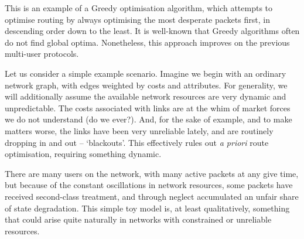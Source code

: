 \documentclass[aps,rmp,twocolumn,amsmath,amssymb,nofootinbib,superscriptaddress,longbibliography,floatfix]{revtex4-1}
\begin{document}
This is an example of a {\sc Greedy} optimisation algorithm, which attempts to optimise routing by always optimising the most desperate packets first, in descending order down to the least. It is well-known that {\sc Greedy} algorithms often do not find global optima. Nonetheless, this approach improves on the previous multi-user protocols.

Let us consider a simple example scenario. Imagine we begin with an ordinary network graph, with edges weighted by costs and attributes. For generality, we will additionally assume the available network resources are very dynamic and unpredictable. The costs associated with links are at the whim of market forces we do not understand (do we ever?). And, for the sake of example, and to make matters worse, the links have been very unreliable lately, and are routinely dropping in and out -- `blackouts'. This effectively rules out \emph{a priori} route optimisation, requiring something dynamic.

There are many users on the network, with many active packets at any give time, but because of the constant oscillations in network resources, some packets have received second-class treatment, and through neglect accumulated an unfair share of state degradation. This simple toy model is, at least qualitatively, something that could arise quite naturally in networks with constrained or unreliable resources.
\end{document}
